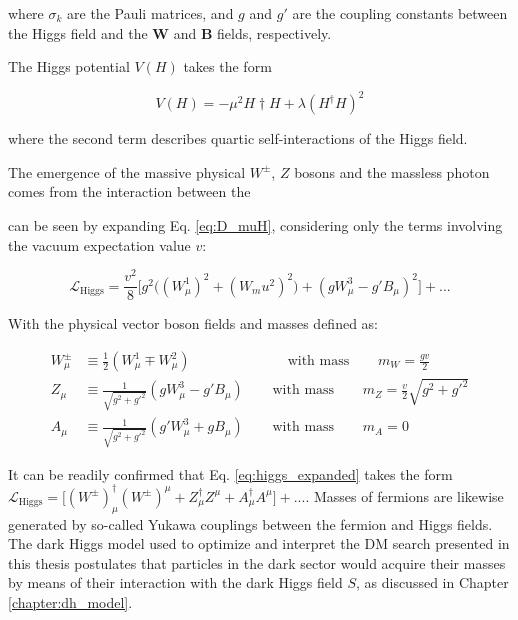 \noindent where \(\sigma_k\) are the Pauli matrices, and \(g\) and \(g'\) are the coupling constants between the Higgs field and the \(\boldsymbol{W}\) and \(\boldsymbol{B}\) fields, respectively.

The Higgs potential \(V(H)\) takes the form 

\begin{equation}
V(H) = -\mu^2H\dagger H + \lambda(H^\dagger H)^2
\end{equation}

\noindent where the second term describes quartic self-interactions of the Higgs field.

The emergence of the massive physical \(W^\pm\), \(Z\) bosons and the massless photon comes from the interaction between the 

 can be seen by expanding Eq. \ref{eq:D_muH}, considering only the terms involving the vacuum expectation value \(v\):

\begin{equation}
\label{eq:higgs_expanded}
\mathcal{L}_\text{Higgs} = \frac{v^2}{8}\Big[g^2\big((W^1_\mu)^2+(W_mu^2)^2\big) + (gW^3_\mu-g'B_\mu)^2\Big] + ...
\end{equation}

With the physical vector boson fields and masses defined as:

\begin{equation}
\begin{split}
W^\pm_\mu & \equiv \frac{1}{2}(W_\mu^1 \mp W_\mu^2) \phantom{xxxxxxxxxlxx}\text{ with mass }\phantom{xxx} m_W=\frac{gv}{2} \\
Z_\mu & \equiv \frac{1}{\sqrt{g^2+g'^2}}(gW_\mu^3-g'B_\mu) \phantom{xxx}\text{ with mass }\phantom{xxx} m_Z = \frac{v}{2}\sqrt{g^2+g'^2} \\
A_\mu & \equiv \frac{1}{\sqrt{g^2+g'^2}}(g'W^3_\mu+gB_\mu) \phantom{xxx}\text{ with mass }\phantom{xxx} m_A = 0
\end{split}
\end{equation}

It can be readily confirmed that Eq. \ref{eq:higgs_expanded} takes the form \(\mathcal{L}_\text{Higgs} = \big[(W^\pm)_\mu^\dagger(W^\pm)^\mu + Z_\mu^\dagger Z^\mu + A_\mu^\dagger A^\mu\big] + ...\). Masses of fermions are likewise generated by so-called Yukawa couplings \cite{weinberg_1967} between the fermion and Higgs fields. The dark Higgs model used to optimize and interpret the DM search presented in this thesis postulates that particles in the dark sector would acquire their masses by means of their interaction with the dark Higgs field \(S\), as discussed in Chapter \ref{chapter:dh_model}. 

